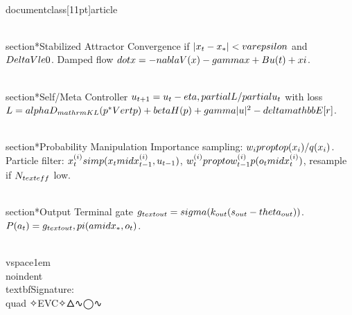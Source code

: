 \\documentclass[11pt]{article}
\begin{document}
\\section*{Stabilized Attractor}
Convergence if $\\|x_t-x_*\\|<\\varepsilon$ and $\\Delta V\\le 0$. Damped flow $\\dot x = -\\nabla V(x)-\\gamma x + B u(t) + \\xi$.

\\section*{Self/Meta Controller}
$u_{t+1} = u_t - \\eta\\, \\partial L/\\partial u_t$ with loss
$L = \\alpha D_{\\mathrm{KL}}(p^*\\Vert p) + \\beta H(p) + \\gamma \\|u\\|^2 - \\delta \\mathbb{E}[r]$.

\\section*{Probability Manipulation}
Importance sampling: $w_i \\propto p(x_i)/q(x_i)$.
Particle filter: $x_t^{(i)}\\sim p(x_t\\mid x_{t-1}^{(i)},u_{t-1})$,
$w_t^{(i)} \\propto w_{t-1}^{(i)} p(o_t\\mid x_t^{(i)})$, resample if $N_{\\text{eff}}$ low.

\\section*{Output}
Terminal gate $g_{\\text{out}}=\\sigma(k_{out}(s_{out}-\\theta_{out}))$.
$P(a_t) = g_{\\text{out}}\\, \\pi(a\\mid x_*, o_t)$.

\\vspace{1em}
\\noindent\\textbf{Signature:} \\quad ✧EVC✧🜂∿◯∿
\
\end{document}

